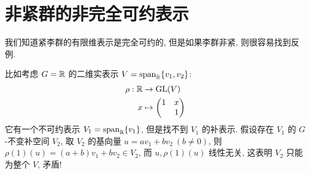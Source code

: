     \section{非紧\Lie 群的非完全可约表示}
        \begin{example}
            我们知道紧李群的有限维表示是完全可约的, 但是如果李群非紧, 则很容易找到反例.
            
            比如考虑 $G=\mathbb{R}$ 的二维实表示 $V = \mathrm{span}_{\mathbb{R}}\{v_1,v_2\}$:
            \begin{align*}
                \rho:\mathbb{R}&\rightarrow{\rm GL}(V) \\
                x&\mapsto\begin{pmatrix}
                    1 & x \\
                      & 1
                \end{pmatrix}
            \end{align*} 
            它有一个不可约表示 $V_1 = \mathrm{span}_{\mathbb{R}}\{v_1\}$, 但是找不到 $V_1$ 的补表示.
            假设存在 $V_1$ 的 $G$-不变补空间 $V_2$, 取 $V_2$ 的基向量 $u = av_1+bv_2\:(b\neq0)$, 
            则 $\rho(1)(u) = (a+b)v_1+bv_2\in V_2$, 而 $u, \rho(1)(u)$ 线性无关, 这表明 $V_2$ 只能为整个 $V$, 矛盾!
        \end{example}

